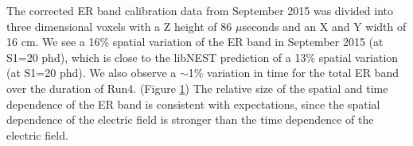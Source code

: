 The corrected ER band calibration data from September 2015 was divided into three dimensional voxels with a Z height of 86 $\mu$seconds and an X and Y width of 16 cm.  We see a 16\% spatial variation of the ER band in September 2015 (at S1=20 phd), which is close to the libNEST prediction of a 13\% spatial variation (at S1=20 phd).  We also observe a $\sim$1\% variation in time for the total ER band over the duration of Run4. (Figure \ref{ERBandVariation}) The relative size of the spatial and time dependence of the ER band is consistent with expectations, since the spatial dependence of the electric field is stronger than the time dependence of the electric field. 


\begin{figure}[!h]
\centering
{}
\qquad
{}
\label{ERBandVariation}
\end{figure}

